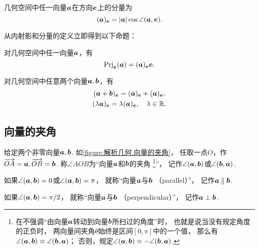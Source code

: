 \begin{theorem}
几何空间中任一向量\(\boldsymbol{a}\)在方向\(\boldsymbol{e}\)上的分量为\begin{equation}
	(\boldsymbol{a})_{\boldsymbol{e}}
	= \abs{\boldsymbol{a}} \cos\angle(\boldsymbol{a},\boldsymbol{e}).
\end{equation}
\end{theorem}

从内射影和分量的定义立即得到以下命题：
\begin{theorem}
对几何空间中任一向量\(\boldsymbol{a}\)，有\begin{equation*}
	\operatorname{Prj}_{\boldsymbol{e}}(\boldsymbol{a})
	= (\boldsymbol{a})_{\boldsymbol{e}} \boldsymbol{e}.
\end{equation*}
\end{theorem}

\begin{theorem}
对几何空间中任意两个向量\(\boldsymbol{a},\boldsymbol{b}\)，有\begin{gather}
	(\boldsymbol{a}+\boldsymbol{b})_{\boldsymbol{e}}
	= (\boldsymbol{a})_{\boldsymbol{e}}
	+ (\boldsymbol{a})_{\boldsymbol{e}}, \\
	(\lambda \boldsymbol{a})_{\boldsymbol{e}}
	= \lambda (\boldsymbol{a})_{\boldsymbol{e}},
	\quad\lambda\in\mathbb{R}.
\end{gather}
\end{theorem}

\subsection{向量的夹角}

\begin{definition}
给定两个非零向量\(\boldsymbol{a},\boldsymbol{b}\).
如\cref{figure:解析几何.向量的夹角}，
任取一点\(O\)，作\(\overrightarrow{OA}=\boldsymbol{a},\overrightarrow{OB}=\boldsymbol{b}\).
称\(\angle{AOB}\)为“向量\(\boldsymbol{a}\)和\(\boldsymbol{b}\)的夹角%
\footnote{%
在不强调“由向量\(\boldsymbol{a}\)转动到向量\(\boldsymbol{b}\)所扫过的角度”时，
也就是说当没有规定角度的正负时，
两向量间夹角\(\theta\)始终是区间\([0,\pi]\)中的一个值，
那么有\(\angle(\boldsymbol{a},\boldsymbol{b}) \equiv \angle(\boldsymbol{b},\boldsymbol{a})\)；%
否则，规定\(\angle(\boldsymbol{a},\boldsymbol{b}) \equiv -\angle(\boldsymbol{b},\boldsymbol{a})\).%
}”，
记作\(\angle(\boldsymbol{a},\boldsymbol{b})\)或\(\angle(\boldsymbol{b},\boldsymbol{a})\).

如果\(\angle(\boldsymbol{a},\boldsymbol{b}) = 0\)或\(\angle(\boldsymbol{a},\boldsymbol{b}) = \pi\)，
就称“向量\(\boldsymbol{a}\)与\(\boldsymbol{b}\) （parallel）”，
记作\(\boldsymbol{a}\parallel\boldsymbol{b}\).

如果\(\angle(\boldsymbol{a},\boldsymbol{b}) = \pi/2\)，
就称“向量\(\boldsymbol{a}\)与\(\boldsymbol{b}\) （perpendicular）”，
记作\(\boldsymbol{a}\perp\boldsymbol{b}\).
\end{definition}

